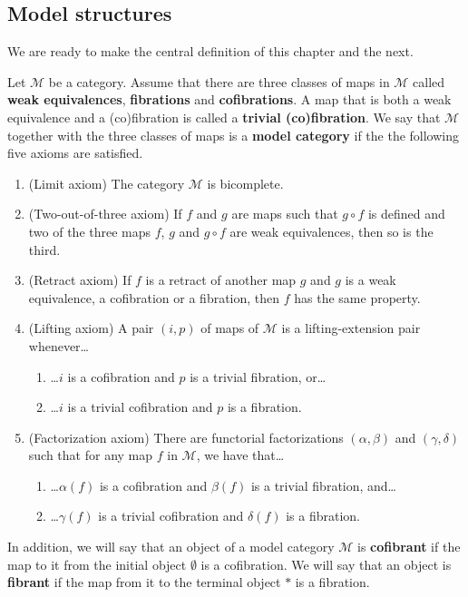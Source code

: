 \subsection{Model structures}

We are ready to make the central definition of this chapter and the next.
\begin{definition}\label{def:model_category}
Let $\mathscr{M}$ be a category. Assume that there are three classes of maps in $\mathscr{M}$ called \textbf{weak equivalences}, \textbf{fibrations} and \textbf{cofibrations}. A map that is both a weak equivalence and a (co)fibration is called a \textbf{trivial (co)fibration}. We say that $\mathscr{M}$ together with the three classes of maps is a \textbf{model category} if the the following five axioms are satisfied.
\begin{enumerate}
\item{(Limit axiom) The category $\mathscr{M}$ is bicomplete.}
\item{(Two-out-of-three axiom) If $f$ and $g$ are maps such that $g\circ f$ is defined and two of the three maps $f$, $g$ and $g\circ f$ are weak equivalences, then so is the third.}
\item{(Retract axiom) If $f$ is a retract of another map $g$ and $g$ is a weak equivalence, a cofibration or a fibration, then $f$ has the same property.}
\item{(Lifting axiom) A pair $(i,p)$ of maps of $\mathscr{M}$ is a lifting-extension pair whenever\dots
\begin{enumerate}
\item{\dots $i$ is a cofibration and $p$ is a trivial fibration, or\dots}
\item{\dots $i$ is a trivial cofibration and $p$ is a fibration.}
\end{enumerate}
}
\item{(Factorization axiom) There are functorial factorizations $(\alpha ,\beta )$ and $(\gamma ,\delta )$ such that for any map $f$ in $\mathscr{M}$, we have that\dots
\begin{enumerate}
\item{\dots $\alpha (f)$ is a cofibration and $\beta (f)$ is a trivial fibration, and\dots}
\item{\dots $\gamma (f)$ is a trivial cofibration and $\delta (f)$ is a fibration.}
\end{enumerate}
}
\end{enumerate}
\end{definition}
\noindent In addition, we will say that an object of a model category $\mathscr{M}$ is \textbf{cofibrant} if the map to it from the initial object $\emptyset$ is a cofibration. We will say that an object is \textbf{fibrant} if the map from it to the terminal object $*$ is a fibration.

